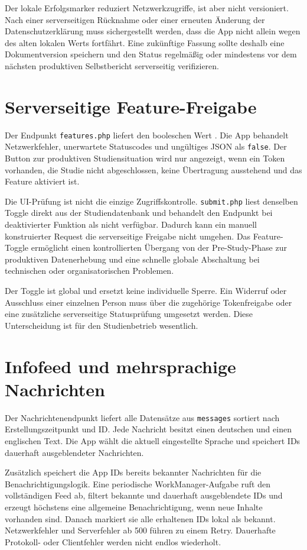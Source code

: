 Der lokale Erfolgsmarker reduziert Netzwerkzugriffe, ist aber nicht versioniert. Nach einer serverseitigen Rücknahme oder einer erneuten Änderung der Datenschutzerklärung muss sichergestellt werden, dass die App nicht allein wegen des alten lokalen Werts fortfährt. Eine zukünftige Fassung sollte deshalb eine Dokumentversion speichern und den Status regelmäßig oder mindestens vor dem nächsten produktiven Selbstbericht serverseitig verifizieren.

\section{Serverseitige Feature-Freigabe}

Der Endpunkt \texttt{features.php} liefert den booleschen Wert . Die App behandelt Netzwerkfehler, unerwartete Statuscodes und ungültiges JSON als \texttt{false}. Der Button zur produktiven Studiensituation wird nur angezeigt, wenn ein Token vorhanden, die Studie nicht abgeschlossen, keine Übertragung ausstehend und das Feature aktiviert ist.

Die UI-Prüfung ist nicht die einzige Zugriffskontrolle. \texttt{submit.php} liest denselben Toggle direkt aus der Studiendatenbank und behandelt den Endpunkt bei deaktivierter Funktion als nicht verfügbar. Dadurch kann ein manuell konstruierter Request die serverseitige Freigabe nicht umgehen. Das Feature-Toggle ermöglicht einen kontrollierten Übergang von der Pre-Study-Phase zur produktiven Datenerhebung und eine schnelle globale Abschaltung bei technischen oder organisatorischen Problemen.

Der Toggle ist global und ersetzt keine individuelle Sperre. Ein Widerruf oder Ausschluss einer einzelnen Person muss über die zugehörige Tokenfreigabe oder eine zusätzliche serverseitige Statusprüfung umgesetzt werden. Diese Unterscheidung ist für den Studienbetrieb wesentlich.

\section{Infofeed und mehrsprachige Nachrichten}

Der Nachrichtenendpunkt liefert alle Datensätze aus \texttt{messages} sortiert nach Erstellungszeitpunkt und ID. Jede Nachricht besitzt einen deutschen und einen englischen Text. Die App wählt die aktuell eingestellte Sprache und speichert IDs dauerhaft ausgeblendeter Nachrichten.

Zusätzlich speichert die App IDs bereits bekannter Nachrichten für die Benachrichtigungslogik. Eine periodische WorkManager-Aufgabe ruft den vollständigen Feed ab, filtert bekannte und dauerhaft ausgeblendete IDs und erzeugt höchstens eine allgemeine Benachrichtigung, wenn neue Inhalte vorhanden sind. Danach markiert sie alle erhaltenen IDs lokal als bekannt. Netzwerkfehler und Serverfehler ab 500 führen zu einem Retry. Dauerhafte Protokoll- oder Clientfehler werden nicht endlos wiederholt.


